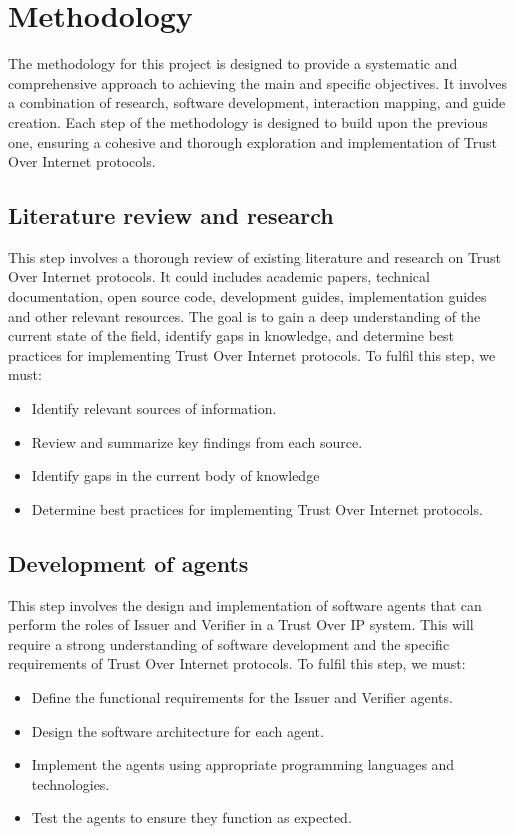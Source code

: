 \section{Methodology}

The methodology for this project is designed to provide a systematic and comprehensive approach to achieving the main and specific objectives. It involves a combination of research, software development, interaction mapping, and guide creation. Each step of the methodology is designed to build upon the previous one, ensuring a cohesive and thorough exploration and implementation of Trust Over Internet protocols.

\subsection{Literature review and research}
This step involves a thorough review of existing literature and research on Trust Over Internet protocols. It could includes academic papers, technical documentation, open source code, development guides, implementation guides and other relevant resources. The goal is to gain a deep understanding of the current state of the field, identify gaps in knowledge, and determine best practices for implementing Trust Over Internet protocols. To fulfil this step, we must:

\begin{itemize}
    \item Identify relevant sources of information.
    \item Review and summarize key findings from each source.
    \item Identify gaps in the current body of knowledge
    \item Determine best practices for implementing Trust Over Internet protocols.
\end{itemize}

\subsection{Development of agents}
This step involves the design and implementation of software agents that can perform the roles of Issuer and Verifier in a Trust Over IP system. This will require a strong understanding of software development and the specific requirements of Trust Over Internet protocols. To fulfil this step, we must:
\begin{itemize}
    \item Define the functional requirements for the Issuer and Verifier agents.
    \item Design the software architecture for each agent.
    \item Implement the agents using appropriate programming languages and technologies.
    \item Test the agents to ensure they function as expected.
\end{itemize}

